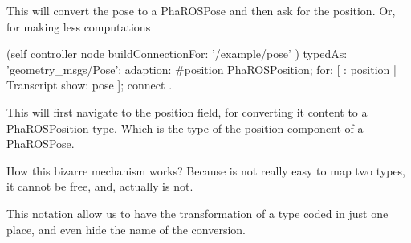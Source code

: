 \documentclass[a4paper,10pt,twoside]{book}
\begin{document}
							
							
							This will convert the pose to a PhaROSPose and then ask for the position. Or, for making less computations
							
							
							
							\begin{code}
				(self controller node buildConnectionFor: '/example/pose' ) 
					typedAs: 'geometry_msgs/Pose'; 
					adaption: #position \> PhaROSPosition;
					for: [ : position |  Transcript show: pose ];
					connect .
					
							\end{code}
							
							This will first navigate to the position field, for converting it content to a PhaROSPosition type. Which is the type of the position component of a PhaROSPose.
							
							
							How this bizarre mechanism works? Because is not really easy to map two types, it cannot be free, and, actually is not.
							
							This notation allow us to have the transformation of a type coded in just one place, and even hide the name of the conversion.
							
\end{document}
